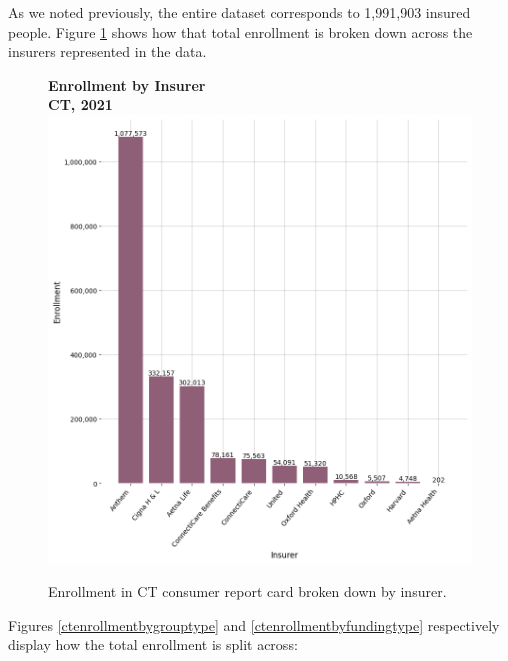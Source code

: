\documentclass[12pt, a4paper,twoside,parskip=full]{report}
\theoremstyle{plain} %
\theoremstyle{definition} %
\theoremstyle{remark} %
\numberwithin{equation}{chapter}
\begin{document}
		As we noted previously, the entire dataset corresponds to 1,991,903 insured people. Figure \ref{ctenrollmentbyinsurer} shows how that total enrollment is broken down across the insurers represented in the data.
		
		
		\begin{figure}[h!]
			\centering
			\textbf{Enrollment by Insurer}\\
			\textbf{CT, 2021}\\
			\includegraphics[width=\columnwidth]{images/ct_claims/enrollment_by_insurer.png}
			\caption{Enrollment in CT consumer report card broken down by insurer.}
			\label{ctenrollmentbyinsurer}
		\end{figure}
		\clearpage
	
		Figures \ref{ctenrollmentbygrouptype} and \ref{ctenrollmentbyfundingtype} respectively display how the total enrollment is split across:
		
\end{document}
